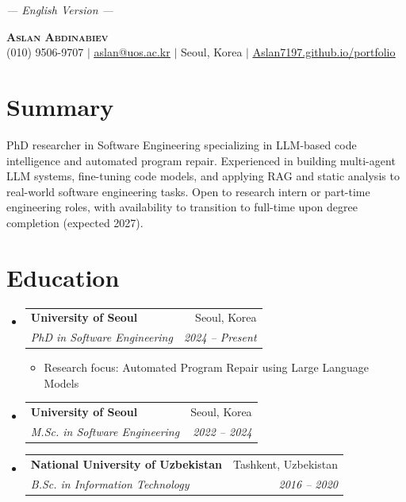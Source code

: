 \documentclass[letterpaper,11pt]{article}
\makeatletter
\newcommand{\resumeItem}[1]{
  \item\small{
    {#1 \vspace{-2pt}}
  }
}
\newcommand{\resumeSubheading}[4]{
  \vspace{-2pt}\item
    \begin{tabular*}{0.97\textwidth}[t]{l@{\extracolsep{\fill}}r}
      \textbf{#1} & #2 \\
      \textit{\small#3} & \textit{\small #4} \\
    \end{tabular*}\vspace{-7pt}
}
\newcommand{\resumeSubHeadingListStart}{\begin{itemize}[leftmargin=0.15in, label={}]}
\newcommand{\resumeSubHeadingListEnd}{\end{itemize}}
\newcommand{\resumeItemListStart}{\begin{itemize}}
\newcommand{\resumeItemListEnd}{\end{itemize}\vspace{-5pt}}
\makeatother
\begin{document}

\begin{center}
\vspace{-25pt}
\small\textit{--- English Version ---}
\end{center}
\vspace{-10pt}

\begin{center}
    \textbf{\Large \scshape Aslan Abdinabiev} \\ \vspace{1pt}
    \small (010) 9506-9707 $|$ \href{mailto:aslan@uos.ac.kr}{\underline{aslan@uos.ac.kr}} $|$
    Seoul, Korea $|$
    \href{https://Aslan7197.github.io/portfolio}{\underline{Aslan7197.github.io/portfolio}}
\end{center}

\vspace{-5pt}
\section{Summary}
 \begin{itemize}[leftmargin=0.15in, label={}]
    \small{\item{
    PhD researcher in Software Engineering specializing in LLM-based code intelligence and automated program repair. Experienced in building multi-agent LLM systems, fine-tuning code models, and applying RAG and static analysis to real-world software engineering tasks. Open to research intern or part-time engineering roles, with availability to transition to full-time upon degree completion (expected 2027).
    }}
 \end{itemize}


\section{Education}
  \resumeSubHeadingListStart
    \resumeSubheading
      {University of Seoul}{Seoul, Korea}
      {PhD in Software Engineering}{2024 -- Present}
      \resumeItemListStart
        \resumeItem{Research focus: Automated Program Repair using Large Language Models}
      \resumeItemListEnd
    \resumeSubheading
      {University of Seoul}{Seoul, Korea}
      {M.Sc. in Software Engineering}{2022 -- 2024}
    \resumeSubheading
      {National University of Uzbekistan}{Tashkent, Uzbekistan}
      {B.Sc. in Information Technology}{2016 -- 2020}
  \resumeSubHeadingListEnd
\end{document}
